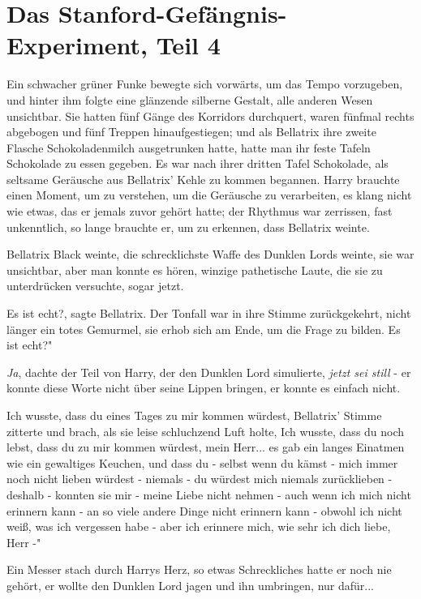 \chapter{Das Stanford-Gefängnis-Experiment, Teil 4}

Ein schwacher grüner Funke bewegte sich vorwärts, um das Tempo vorzugeben, und
hinter ihm folgte eine glänzende silberne Gestalt, alle anderen Wesen
unsichtbar. Sie hatten fünf Gänge des Korridors durchquert, waren fünfmal rechts
abgebogen und fünf Treppen hinaufgestiegen; und als Bellatrix ihre zweite
Flasche Schokoladenmilch ausgetrunken hatte, hatte man ihr feste Tafeln
Schokolade zu essen gegeben. Es war nach ihrer dritten Tafel Schokolade, als
seltsame Geräusche aus Bellatrix' Kehle zu kommen begannen. Harry brauchte einen
Moment, um zu verstehen, um die Geräusche zu verarbeiten, es klang nicht wie
etwas, das er jemals zuvor gehört hatte; der Rhythmus war zerrissen, fast
unkenntlich, so lange brauchte er, um zu erkennen, dass Bellatrix weinte.

Bellatrix Black weinte, die schrecklichste Waffe des Dunklen Lords weinte, sie
war unsichtbar, aber man konnte es hören, winzige pathetische Laute, die sie zu
unterdrücken versuchte, sogar jetzt.

\glqq{}Es ist echt?\grqq{}, sagte Bellatrix. Der Tonfall war in ihre Stimme
zurückgekehrt, nicht länger ein totes Gemurmel, sie erhob sich am Ende, um die
Frage zu bilden. \glqq{}Es ist echt?"

\emph{Ja}, dachte der Teil von Harry, der den Dunklen Lord simulierte,
\emph{jetzt sei still} - er konnte diese Worte nicht über seine Lippen bringen,
er konnte es einfach nicht.

\glqq{}Ich wusste, dass du eines Tages zu mir kommen würdest\grqq{}, Bellatrix'
Stimme zitterte und brach, als sie leise schluchzend Luft holte, \glqq{}Ich
wusste, dass du noch lebst, dass du zu mir kommen würdest, mein Herr... \glqq{}es
gab ein langes Einatmen wie ein gewaltiges Keuchen, \glqq{}und dass du - selbst
wenn du kämst - mich immer noch nicht lieben würdest - niemals - du würdest mich
niemals zurücklieben - deshalb - konnten sie mir - meine Liebe nicht nehmen -
auch wenn ich mich nicht erinnern kann - an so viele andere Dinge nicht erinnern
kann - obwohl ich nicht weiß, was ich vergessen habe - aber ich erinnere mich,
wie sehr ich dich liebe, Herr -"

Ein Messer stach durch Harrys Herz, so etwas Schreckliches hatte er noch nie
gehört, er wollte den Dunklen Lord jagen und ihn umbringen, nur dafür...


